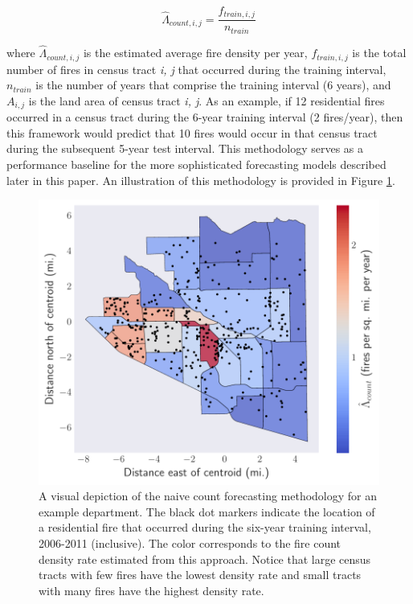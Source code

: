 \documentclass{svjour3}
\begin{document}
\begin{equation}
  \label{eqn:naive_count}
  \hat{\Lambda}_{count,i,j} = \frac{f_{train,i,j}}{n_{train}} 
\end{equation}

\noindent where $\hat{\Lambda}_{count,i,j}$ is the estimated average fire density per year, $f_{train,i,j}$ is the total number of fires in census tract \textit{i, j} that occurred during the training interval, $n_{train}$ is the number of years that comprise the training interval (6 years), and $A_{i,j}$ is the land area of census tract \textit{i, j}. As an example, if 12 residential fires occurred in a census tract during the 6-year training interval (2 fires/year), then this framework would predict that 10 fires would occur in that census tract during the subsequent 5-year test interval. This methodology serves as a performance baseline for the more sophisticated forecasting models described later in this paper. An illustration of this methodology is provided in Figure \ref{fig:spatial_histogram}. 


\begin{figure}[htb] \centering
\includegraphics[width=.5\textwidth]{./figures/spatial_histogram.pdf}
\caption{A visual depiction of the naive count forecasting methodology for an example department. The black dot markers indicate the location of a residential fire that occurred during the six-year training interval, 2006-2011 (inclusive). The color corresponds to the fire count density rate estimated from this approach. Notice that large census tracts with few fires have the lowest density rate and small tracts with many fires have the highest density rate.}
\label{fig:spatial_histogram}
\end{figure}
\end{document}
